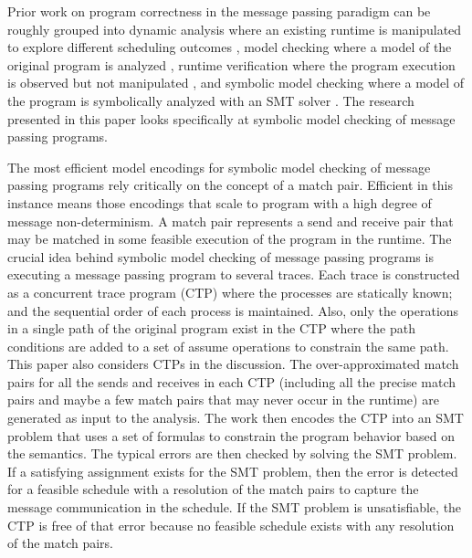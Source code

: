 Prior work on program correctness in the message passing paradigm can be roughly grouped into dynamic analysis where an existing runtime is manipulated to explore different scheduling outcomes \cite{DBLP:conf/ppopp/VakkalankaSGK08,DBLP:conf/sbmf/SharmaGB12}, model checking where a model of the original program is analyzed \cite{DBLP:conf/vmcai/Siegel07,DBLP:conf/pvm/Siegel07}, runtime verification where the program execution is observed but not manipulated \cite{DBLP:conf/sc/VetterS00,DBLP:conf/parco/KrammerBMR03,DBLP:conf/ptw/HilbrichSSM09}, and symbolic model checking where a model of the program is symbolically analyzed with an SMT solver \cite{DBLP:conf/kbse/HuangMM13,HuangNFM15,HuangDeadlock}. The research presented in this paper looks specifically at symbolic model checking of message passing programs.

The most efficient model encodings for symbolic model checking of message passing programs rely critically on the concept of a match pair. Efficient in this instance means those encodings that scale to program with a high degree of message non-determinism.  A match pair represents a send and receive pair that may be matched in some feasible execution of the program in the runtime. 
The crucial idea behind symbolic model checking of message passing programs is executing a message passing program to several traces. Each trace is constructed as a concurrent trace program (CTP) where the processes are statically known; and the sequential order of each process is maintained. Also, only the operations in a single path of the original program exist in the CTP where the path conditions are added to a set of assume operations to constrain the same path. This paper also considers CTPs in the discussion. The over-approximated match pairs for all the sends and receives in each CTP (including all the precise match pairs and maybe a few match pairs that may never occur in the runtime) are generated as input to the analysis. The work then encodes the CTP into an SMT problem that uses a set of formulas to constrain the program behavior based on the semantics. The typical errors are then checked by solving the SMT problem. If a satisfying assignment exists for the SMT problem, then the error is detected for a feasible schedule with a resolution of the match pairs to capture the message communication in the schedule. If the SMT problem is unsatisfiable, the CTP is free of that error because no feasible schedule exists with any resolution of the match pairs. 

